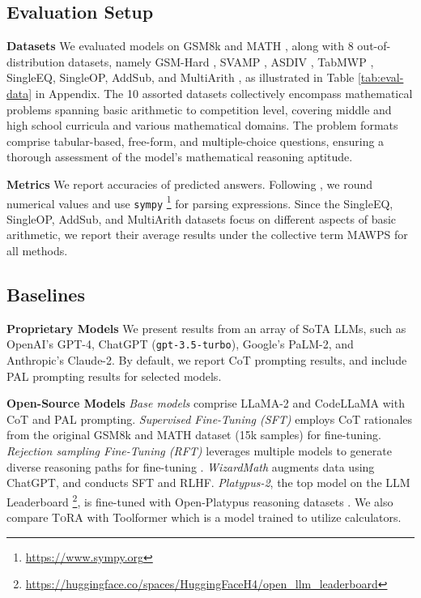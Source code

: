 \subsection{Evaluation Setup}

\textbf{Datasets} We evaluated models on GSM8k \citep{cobbe2021gsm8k} and MATH \citep{hendrycksmath2021}, along with 8 out-of-distribution datasets, namely GSM-Hard \citep{gao2022pal}, SVAMP \citep{patel2021svamp}, ASDIV \citep{miao-etal-2020-diverse}, TabMWP \citep{lu2023dynamic}, SingleEQ, SingleOP, AddSub, and MultiArith \citep{koncel-kedziorski-etal-2016-mawps}, as illustrated in Table \ref{tab:eval-data} in Appendix. The 10 assorted datasets collectively encompass mathematical problems spanning basic arithmetic to competition level, covering middle and high school curricula and various mathematical domains. The problem formats comprise tabular-based, free-form, and multiple-choice questions, ensuring a thorough assessment of the model's mathematical reasoning aptitude.

\textbf{Metrics}
We report accuracies of predicted answers. Following \citet{lightman2023let}, we round numerical values and use \texttt{sympy} \footnote{\url{https://www.sympy.org}} for parsing expressions. Since the SingleEQ, SingleOP, AddSub, and MultiArith datasets focus on different aspects of basic arithmetic, we report their average results under the collective term MAWPS \citep{koncel-kedziorski-etal-2016-mawps} for all methods.

\subsection{Baselines}

\textbf{Proprietary Models} We present results from an array of SoTA LLMs, such as OpenAI's GPT-4, ChatGPT (\texttt{gpt-3.5-turbo}), Google's PaLM-2, and Anthropic's Claude-2. By default, we report CoT prompting results, and include PAL \citep{gao2022pal} prompting results for selected models.

\textbf{Open-Source Models}
\textit{Base models} comprise LLaMA-2 and CodeLLaMA with CoT and PAL prompting. \textit{Supervised Fine-Tuning (SFT)} employs CoT rationales from the original GSM8k and MATH dataset (15k samples) for fine-tuning. \textit{Rejection sampling Fine-Tuning (RFT)} leverages multiple models to generate diverse reasoning paths for fine-tuning \citep{yuan2023scaling}. \textit{WizardMath} augments data using ChatGPT, and conducts SFT and RLHF. \textit{Platypus-2}, the top model on the LLM Leaderboard \footnote{\url{https://huggingface.co/spaces/HuggingFaceH4/open_llm_leaderboard}}, is fine-tuned with Open-Platypus reasoning datasets \citep{lee2023platypus}. We also compare \textsc{ToRA} with Toolformer \citep{schick2023toolformer} which is a model trained to utilize calculators.


